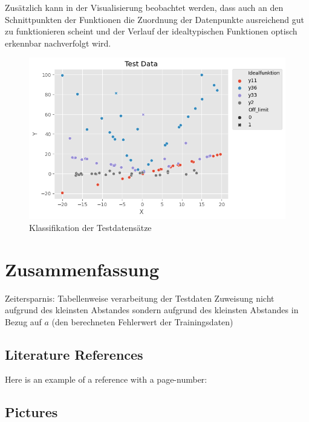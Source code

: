 Zusätzlich kann in der Visualisierung beobachtet werden, dass auch an den Schnittpunkten der Funktionen die Zuordnung der Datenpunkte ausreichend gut zu funktionieren scheint und der Verlauf der idealtypischen Funktionen optisch erkennbar nachverfolgt wird.


\begin{figure}[h]
\centering
\includegraphics[width=12cm]{../output/figures/test.png}
\caption{Klassifikation der Testdatensätze \cite{Gage:18}}\label{fig:test}
\end{figure}


\chapter{Zusammenfassung}

Zeitersparnis: Tabellenweise verarbeitung der Testdaten
Zuweisung nicht aufgrund des kleinsten Abstandes sondern aufgrund des kleinsten Abstandes in Bezug auf $a$ (den berechneten Fehlerwert der Trainingsdaten)



\section{Literature References}
Here is an example of a reference with a page-number: \cite[S. 6]{DueckKo:2016}


\section{Pictures}


